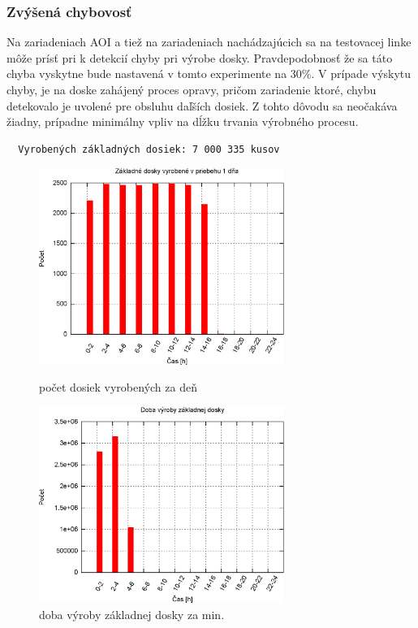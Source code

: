 \documentclass[12pt,a4paper,titlepage,final]{article}
\begin{document}
\newpage

\subsubsection{Zvýšená chybovosť}
Na zariadeniach AOI a tiež na zariadeniach nachádzajúcich
sa na testovacej linke môže prísť pri k detekcií chyby
pri výrobe dosky. Pravdepodobnosť že sa táto chyba vyskytne 
bude nastavená v tomto experimente na 30\%. V prípade výskytu chyby,
je na doske zahájený proces opravy, pričom zariadenie ktoré, chybu
detekovalo je uvolené pre obsluhu daľších dosiek. Z tohto
dôvodu sa neočakáva žiadny, prípadne minimálny vpliv na dĺžku
trvania výrobného procesu.

\begin{verbatim}
  Vyrobených základných dosiek: 7 000 335 kusov
\end{verbatim}

\begin{figure}[!ht]
  \centering
  \begin{minipage}{0.45\linewidth}
  \centering
  \includegraphics[width=8cm]{doc/4_hist1.eps}
  \caption{počet dosiek vyrobených za deň}
  \end{minipage}
  \quad
  \begin{minipage}{0.45\linewidth}
    \centering
    \includegraphics[width=8cm]{doc/4_hist2.eps}
    \caption{doba výroby základnej dosky za min.}
  \end{minipage}
\end{figure}
\end{document}
